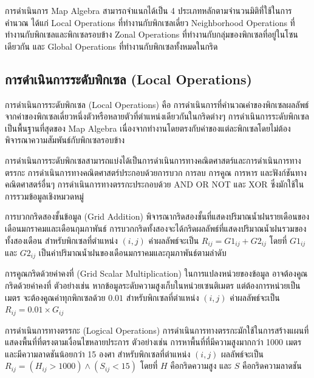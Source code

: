 การดำเนินการ Map Algebra สามารถจำแนกได้เป็น 4 ประเภทหลักตามจำนวนมิติที่ใช้ในการคำนวณ ได้แก่ Local Operations ที่ทำงานกับพิกเซลเดี่ยว Neighborhood Operations ที่ทำงานกับพิกเซลและพิกเซลรอบข้าง Zonal Operations ที่ทำงานกับกลุ่มของพิกเซลที่อยู่ในโซนเดียวกัน และ Global Operations ที่ทำงานกับพิกเซลทั้งหมดในกริด

\subsection{การดำเนินการระดับพิกเซล (Local Operations)}

การดำเนินการระดับพิกเซล (Local Operations) คือ การดำเนินการที่คำนวณค่าของพิกเซลผลลัพธ์จากค่าของพิกเซลเดี่ยวหนึ่งตัวหรือหลายตัวที่ตำแหน่งเดียวกันในกริดต่างๆ การดำเนินการระดับพิกเซลเป็นพื้นฐานที่สุดของ Map Algebra เนื่องจากทำงานโดยตรงกับค่าของแต่ละพิกเซลโดยไม่ต้องพิจารณาความสัมพันธ์กับพิกเซลรอบข้าง

การดำเนินการระดับพิกเซลสามารถแบ่งได้เป็นการดำเนินการทางคณิตศาสตร์และการดำเนินการทางตรรกะ การดำเนินการทางคณิตศาสตร์ประกอบด้วยการบวก การลบ การคูณ การหาร และฟังก์ชันทางคณิตศาสตร์อื่นๆ การดำเนินการทางตรรกะประกอบด้วย AND OR NOT และ XOR ซึ่งมักใช้ในการรวมข้อมูลเชิงหมวดหมู่

\begin{ex}
การบวกกริดสองชั้นข้อมูล (Grid Addition) พิจารณากริดสองชั้นที่แสดงปริมาณน้ำฝนรายเดือนของเดือนมกราคมและเดือนกุมภาพันธ์ การบวกกริดทั้งสองจะได้กริดผลลัพธ์ที่แสดงปริมาณน้ำฝนรวมของทั้งสองเดือน สำหรับพิกเซลที่ตำแหน่ง $(i, j)$ ค่าผลลัพธ์จะเป็น $R_{ij} = G1_{ij} + G2_{ij}$ โดยที่ $G1_{ij}$ และ $G2_{ij}$ เป็นค่าปริมาณน้ำฝนของเดือนมกราคมและกุมภาพันธ์ตามลำดับ
\end{ex}

\begin{ex}
การคูณกริดด้วยค่าคงที่ (Grid Scalar Multiplication) ในการแปลงหน่วยของข้อมูล อาจต้องคูณกริดด้วยค่าคงที่ ตัวอย่างเช่น หากข้อมูลระดับความสูงเก็บในหน่วยเซนติเมตร แต่ต้องการหน่วยเป็นเมตร จะต้องคูณค่าทุกพิกเซลด้วย $0.01$ สำหรับพิกเซลที่ตำแหน่ง $(i, j)$ ค่าผลลัพธ์จะเป็น $R_{ij} = 0.01 \times G_{ij}$
\end{ex}

\begin{ex}
การดำเนินการทางตรรกะ (Logical Operations) การดำเนินการทางตรรกะมักใช้ในการสร้างแผนที่แสดงพื้นที่ที่ตรงตามเงื่อนไขหลายประการ ตัวอย่างเช่น การหาพื้นที่ที่มีความสูงมากกว่า 1000 เมตร และมีความลาดชันน้อยกว่า 15 องศา สำหรับพิกเซลที่ตำแหน่ง $(i, j)$ ผลลัพธ์จะเป็น $R_{ij} = (H_{ij} > 1000) \land (S_{ij} < 15)$ โดยที่ $H$ คือกริดความสูง และ $S$ คือกริดความลาดชัน
\end{ex}

